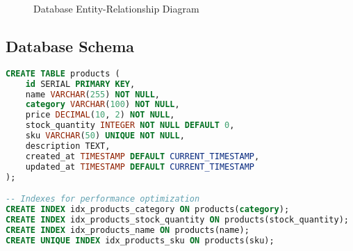 \documentclass[12pt,a4paper]{article}
\begin{document}
\begin{figure}[H]
    \centering
    \caption{Database Entity-Relationship Diagram}
\end{figure}

\subsection{Database Schema}

\begin{lstlisting}[language=SQL, caption=Product Table Schema]
CREATE TABLE products (
    id SERIAL PRIMARY KEY,
    name VARCHAR(255) NOT NULL,
    category VARCHAR(100) NOT NULL,
    price DECIMAL(10, 2) NOT NULL,
    stock_quantity INTEGER NOT NULL DEFAULT 0,
    sku VARCHAR(50) UNIQUE NOT NULL,
    description TEXT,
    created_at TIMESTAMP DEFAULT CURRENT_TIMESTAMP,
    updated_at TIMESTAMP DEFAULT CURRENT_TIMESTAMP
);

-- Indexes for performance optimization
CREATE INDEX idx_products_category ON products(category);
CREATE INDEX idx_products_stock_quantity ON products(stock_quantity);
CREATE INDEX idx_products_name ON products(name);
CREATE UNIQUE INDEX idx_products_sku ON products(sku);
\end{lstlisting}
\end{document}
